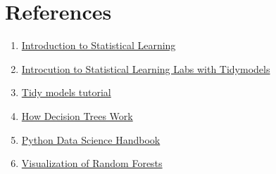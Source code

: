 \documentclass[
  letterpaper,
  DIV=11,
  numbers=noendperiod]{scrreprt}
\begin{document}
\hypertarget{references-2}{%
\section{References}\label{references-2}}

\begin{enumerate}
\def\labelenumi{\arabic{enumi}.}
\item
  \href{https://www.statlearning.com/}{Introduction to Statistical
  Learning}
\item
  \href{https://emilhvitfeldt.github.io/ISLR-tidymodels-labs/}{Introcution
  to Statistical Learning Labs with Tidymodels}
\item
  \href{https://www.tidymodels.org/start/case-study/}{Tidy models
  tutorial}
\item
  \href{https://dataaspirant.com/how-decision-tree-algorithm-works/}{How
  Decision Trees Work}
\item
  \href{https://jakevdp.github.io/PythonDataScienceHandbook/05.08-random-forests.html}{Python
  Data Science Handbook}
\item
  \href{https://towardsdatascience.com/rfviz-an-interactive-visualization-package-for-random-forests-in-r-8fb71709c8bf}{Visualization
  of Random Forests}
\end{enumerate}
\end{document}
